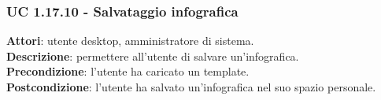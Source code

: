 \subsubsection{UC 1.17.10 - Salvataggio infografica}{
	\label{uc1.17.10}
	\textbf{Attori}: utente desktop, amministratore di sistema. \\
	\textbf{Descrizione}: permettere all’utente di salvare un’infografica. \\
	\textbf{Precondizione}: l'utente ha caricato un template.	\\
	\textbf{Postcondizione}: l'utente ha salvato un’infografica nel suo spazio personale.	\\
	}
